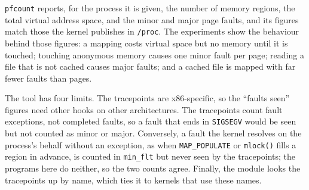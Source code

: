 \texttt{pfcount} reports, for the process it is given, the number of memory
regions, the total virtual address space, and the minor and major page
faults, and its figures match those the kernel publishes in \texttt{/proc}.
The experiments show the behaviour behind those figures: a mapping costs
virtual space but no memory until it is touched; touching anonymous memory
causes one minor fault per page; reading a file that is not cached causes
major faults; and a cached file is mapped with far fewer faults than pages.

The tool has four limits. The tracepoints are x86-specific, so the
``faults seen'' figures need other hooks on other architectures. The
tracepoints count fault exceptions, not completed faults, so a fault that
ends in \texttt{SIGSEGV} would be seen but not counted as minor or major.
Conversely, a fault the kernel resolves on the process's behalf without an
exception, as when \texttt{MAP\_POPULATE} or \texttt{mlock()} fills a region
in advance, is counted in \texttt{min\_flt} but never seen by the
tracepoints; the programs here do neither, so the two counts agree. Finally, the module looks the tracepoints up by name, which ties it to
kernels that use these names.
